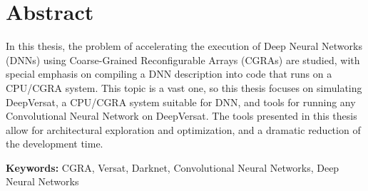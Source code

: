 
\section*{Abstract}


In this thesis, the problem of accelerating the execution of Deep Neural
Networks (DNNs) using Coarse-Grained Reconfigurable Arrays (CGRAs) are studied,
with special emphasis on compiling a DNN description into code that runs on a
CPU/CGRA system. This topic is a vast one, so this thesis focuses on simulating
DeepVersat, a CPU/CGRA system suitable for DNN, and tools for running any
Convolutional Neural Network on DeepVersat. The tools presented in this thesis
allow for architectural exploration and optimization, and a dramatic reduction
of the development time.


\vfill

\textbf{\Large Keywords:} CGRA, Versat, Darknet, Convolutional Neural Networks, Deep Neural Networks



